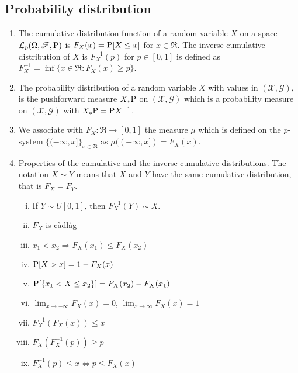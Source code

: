 \documentclass[a4paper,10pt]{article}
\begin{document}
\subsection{Probability distribution}
\begin{enumerate} 
 \item 
 \label{rv221088}
 The cumulative distribution function of a random variable $X$ on a space
 $\mathcal{L}_p(\Omega,\mathscr{F},\mathrm{P})$ is $F_X(x) = \mathrm{P}[X\leq x]$ for $x\in\Re$. The inverse cumulative
 distribution of $X$ is $F_X^{-1}(p)$ for $p\in[0,1]$ is defined as 
 $F_X^{-1}=\inf\{x\in\Re: F_X(x) \geq p\}$. 
 
 \item 
 \label{rv221089}
 The probability distribution of a random variable $X$ with values in $(\mathcal{X},\mathscr{G})$,
 is the pushforward measure $X_*\mathrm{P}$ on $(\mathcal{X},\mathscr{G})$ which is 
 a probability measure on $(\mathcal{X},\mathscr{G})$ with $X_*\mathrm{P} = \mathrm{P} X^{-1}$.
 
 
 \item
 \label{rv221137}
 We associate with $F_X:\Re\to[0,1]$ the measure $\mu$ which is defined on 
 the $p$-system $\{(-\infty,x]\}_{x\in\Re}$ as $\mu((-\infty, x]) = F_X(x)$.
 \item
 \label{rv231132}
 Properties of the cumulative and the inverse cumulative distributions. The notation
 $X\sim Y$ means that $X$ and $Y$ have the same cumulative distribution, that is 
 $F_X = F_Y$.
    \begin{enumerate}[i.]
      \item If $Y\sim U[0,1]$, then $F_X^{-1}(Y) \sim X$.
      \item $F_X$ is c\`adl\`ag
      \item $x_1<x_2 \Rightarrow F_X(x_1) \leq F_X(x_2)$
      \item $\mathrm{P}[X>x] = 1 - F_X(x)$
      \item $\mathrm{P}[\{x_1 < X \leq x_2\}] = F_X(x_2) - F_X(x_1)$
      \item $\lim_{x\to-\infty}F_X(x) = 0$, $\lim_{x\to\infty}F_X(x) = 1$
      \item $F_X^{-1}(F_X(x)) \leq x$
      \item $F_X(F_X^{-1}(p)) \geq p$
      \item $F_X^{-1}(p) \leq x \Leftrightarrow p \leq F_X(x)$
    \end{enumerate}
\end{enumerate}
\end{document}
